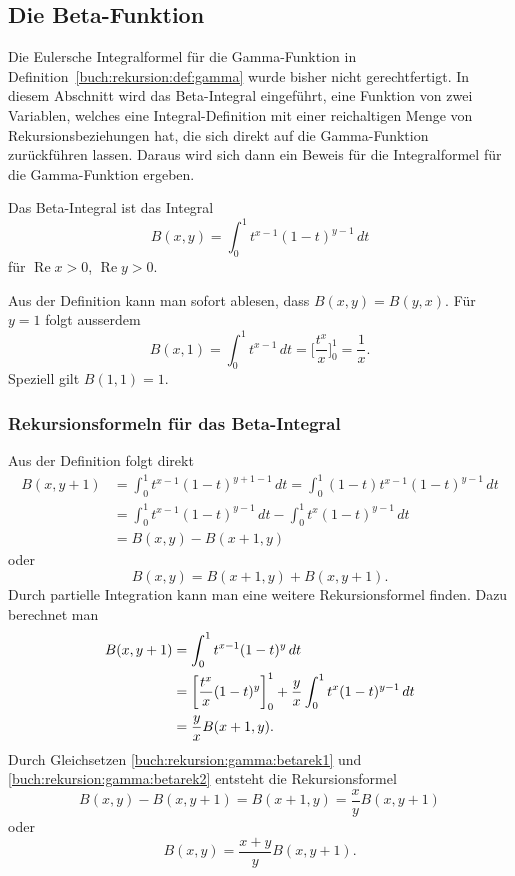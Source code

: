 %
%
%
\subsection{Die Beta-Funktion
\label{buch:rekursion:gamma:subsection:beta}}
Die Eulersche Integralformel für die Gamma-Funktion in
Definition~\ref{buch:rekursion:def:gamma} wurde bisher nicht
gerechtfertigt.
In diesem Abschnitt wird das Beta-Integral eingeführt, eine Funktion
von zwei Variablen, welches eine Integral-Definition mit einer
reichaltigen Menge von Rekursionsbeziehungen hat, die sich direkt auf
die Gamma-Funktion zurückführen lassen.
Daraus wird sich dann ein Beweis für die Integralformel für die
Gamma-Funktion ergeben.

\begin{definition}
\label{buch:rekursion:gamma:def:beta-funktion}
Das Beta-Integral ist das Integral
\[
B(x,y)
=
\int_0^1 t^{x-1} (1-t)^{y-1}\,dt
\]
für $\operatorname{Re}x>0$, $\operatorname{Re}y>0$.
\end{definition}

Aus der Definition kann man sofort ablesen, dass $B(x,y)=B(y,x)$.
Für $y=1$ folgt ausserdem
\begin{equation}
B(x,1)
=
\int_0^1 t^{x-1}\,dt
=
\biggl[ \frac{t^x}{x}\biggr]_0^1
=
\frac{1}{x}.
\label{buch:rekursion:gamma:betax1}
\end{equation}
Speziell gilt $B(1,1)=1$.

\subsubsection{Rekursionsformeln für das Beta-Integral}
Aus der Definition folgt direkt
\begin{align*}
B(x,y+1)
&=
\int_0^1 t^{x-1} (1-t)^{y+1-1}\,dt
=
\int_0^1 (1-t) t^{x-1} (1-t)^{y-1}\,dt
\\
&=
\int_0^1 t^{x-1} (1-t)^{y-1}\,dt
-
\int_0^1 t^{x} (1-t)^{y-1}\,dt
\\
&=
B(x,y) - B(x+1,y)
\end{align*}
oder
\begin{equation}
B(x,y) = B(x+1,y) + B(x,y+1).
\label{buch:rekursion:gamma:betarek1}
\end{equation}
%
%
Durch partielle Integration kann man eine weitere Rekursionsformel finden.
Dazu berechnet man
\begin{align}
B(x,y+1)
&=
\int_0^1 t^{x-1}(1-t)^{y}\,dt
\notag
\\
&=
\biggl[\frac{t^x}x(1-t)^y\biggr]_0^1
+
\frac{y}x \int_0^1 t^x(1-t)^{y-1}\,dt
\notag
\\
&=
 \frac{y}x B(x+1,y).
\label{buch:rekursion:gamma:betarek2}
\end{align}
Durch Gleichsetzen
\eqref{buch:rekursion:gamma:betarek1}
und
\eqref{buch:rekursion:gamma:betarek2}
entsteht die Rekursionsformel
\[
B(x,y)-B(x,y+1)
=
B(x+1,y)
=
\frac{x}{y}B(x,y+1)
\]
oder
\begin{equation}
B(x,y)
=
\frac{x+y}{y}B(x,y+1).
\label{buch:rekursion:gamma:betarek3}
\end{equation}

